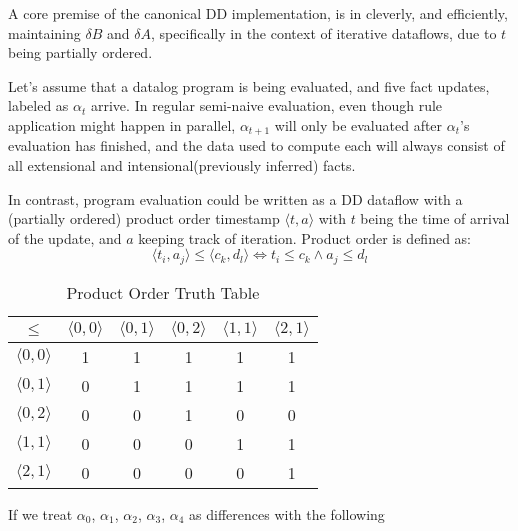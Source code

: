 \documentclass[sigconf,screen,review=false,natbib]{acmart}
\theoremstyle{definition}
\begin{document}
A core premise of the canonical DD implementation, is in cleverly, and efficiently, maintaining $\delta B$
and $\delta A$, specifically in the context of iterative dataflows, due to $t$ being partially ordered.

Let's assume that a datalog program is being evaluated, and five fact updates, labeled as $\alpha_t$ arrive. In
regular semi-naive evaluation, even though rule application might happen in parallel, $\alpha_{t + 1}$ will only be
evaluated after $\alpha_{t}$'s evaluation has finished, and the data used to compute each will always consist of all
extensional and intensional(previously inferred) facts.

In contrast, program evaluation could be written as a DD dataflow with a (partially ordered) product order timestamp $\langle  t, a \rangle$
with $t$ being the time of arrival of the update, and $a$ keeping track of iteration. Product order is defined as: \[\langle t_i, a_j \rangle \leq \langle c_k, d_l \rangle \iff t_i \leq c_k \wedge a_j \leq d_l\]
\begin{table}
	\caption{Product Order Truth Table}
	\begin{tabular}{|c|c|c|c|c|c|}
		\hline
		$\leq$                 & $\langle 0, 0 \rangle$ & $\langle 0, 1 \rangle$ & $\langle 0, 2 \rangle$ & $\langle 1, 1 \rangle$ & $\langle 2, 1 \rangle$ \\
		\hline
		$\langle 0, 0 \rangle$ & 1                      & 1                      & 1                      & 1                      & 1                      \\
		\hline
		$\langle 0, 1 \rangle$ & 0                      & 1                      & 1                      & 1                      & 1                      \\
		\hline
		$\langle 0, 2 \rangle$ & 0                      & 0                      & 1                      & 0                      & 0                      \\
		\hline
		$\langle 1, 1 \rangle$ & 0                      & 0                      & 0                      & 1                      & 1                      \\
		\hline
		$\langle 2, 1 \rangle$ & 0                      & 0                      & 0                      & 0                      & 1                      \\
		\hline
	\end{tabular}
	\label{tab:prod_order}
\end{table}
If we treat $\alpha_0$, $\alpha_1$, $\alpha_2$, $\alpha_3$, $\alpha_4$ as differences with the following
\end{document}
